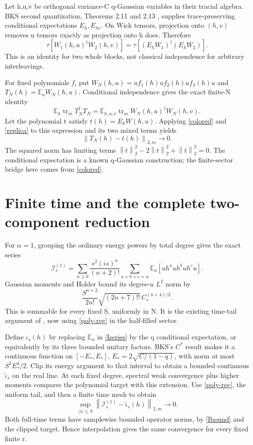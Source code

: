\documentclass[11pt]{article}
\newcommand{\E}{\mathbb E}
\newcommand{\tr}{\operatorname{tr}}
\newcommand{\norm}[1]{\left\lVert#1\right\rVert}
\begin{document}
Let h,u,v be orthogonal variance-C q-Gaussian variables in their
tracial algebra. BKS second quantization, Theorems 2.11 and 2.13
\cite{bks}, supplies trace-preserving conditional expectations
$E_h,E_{hv}$. On Wick tensors, projection onto $(h,v)$ removes
u tensors exactly as projection onto h does. Therefore
\begin{equation}\label{replica}
 \tau[W_1(h,u)^\dagger W_2(h,v)]
 =\tau[(E_hW_1)^\dagger(E_hW_2)].
\end{equation}
This is an identity for two whole blocks, not classical
independence for arbitrary interleavings.

For fixed polynomials $f_i$ put
$W_N(h,u)=u f_1(h)u f_2(h)u f_3(h)u$ and
$T_N(h)=\E_uW_N(h,u)$. Conditional independence gives the exact
finite-N identity
\[
 \E_h\tr_m T_N^\dagger T_N
 =\E_{h,u,v}\tr_m W_N(h,u)^\dagger W_N(h,v).
\]
Let the polynomial t satisfy $t(h)=E_hW(h,u)$. Applying
\eqref{colored} and \eqref{replica} to this expression and its
two mixed terms yields
\begin{equation}\label{poly-reg}
 \norm{T_N(h)-t(h)}_{2,m}\longrightarrow0.
\end{equation}
The squared norm has limiting terms
$\norm t_2^2-2\norm t_2^2+\norm t_2^2=0$.
The conditional expectation is a known q-Gaussian construction;
the finite-sector bridge here comes from \eqref{colored}.

\newpage
\section{Finite time and the complete two-component reduction}
For $\alpha=1$, grouping the ordinary energy powers by total degree
gives the exact series
\begin{equation}\label{Iseries}
 \mathcal I_s^{(1)}=\sum_{n\ge0}\frac{s^2(is)^n}{(n+2)!}
   \sum_{a+b+c=n}\E_u[u h^a u h^b u h^c u].
\end{equation}
Gaussian moments and Holder bound its degree-n $L^2$ norm by
\[
 \frac{S^{n+2}}{2n!}\sqrt{(2n+7)!!}\,C_*^{(n+4)/2}.
\]
This is summable for every fixed S, uniformly in N. It is the
existing time-tail argument of \cite{two}, now using
\eqref{poly-reg} in the half-filled sector.

Define $\iota_s(h)$ by replacing $\E_u$ in \eqref{Iseries} by
the q conditional expectation, or equivalently by its three
bounded unitary factors. BKS's $C^*$ result makes it a continuous
function on $[-E_*,E_*]$, $E_*=2\sqrt{C/(1-q)}$, with norm
at most $S^2E_*^4/2$. Clip its energy argument to that interval
to obtain a bounded continuous $\widetilde\iota_s$ on the real line.
At each fixed degree, spectral weak convergence plus higher
moments compares the polynomial target with this extension.
Use \eqref{poly-reg}, the uniform tail, and then a finite time
mesh to obtain
\[
 \sup_{|s|\le S}\norm{\mathcal I_s^{(1)}-
                         \widetilde\iota_s(h)}_{2,m}\to0.
\]
Both full-time terms have samplewise bounded operator norms,
by \eqref{Ibound} and the clipped target. Hence interpolation
gives the same convergence for every fixed finite r.
\end{document}
